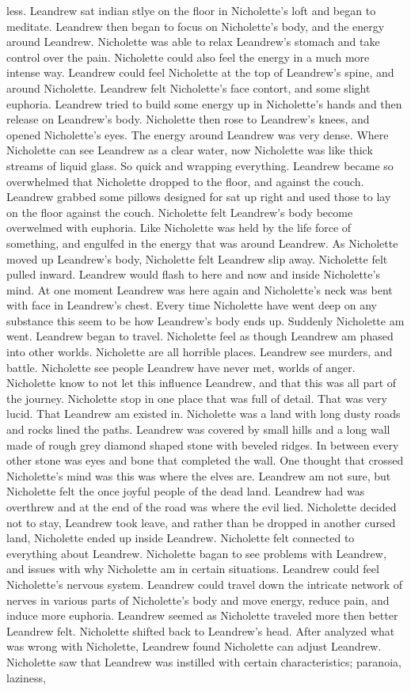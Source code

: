 \documentclass[12pt]{book}
\begin{document}
less. Leandrew sat indian stlye on the floor in Nicholette's loft and began to meditate. Leandrew then began to focus on Nicholette's body, and the energy around Leandrew. Nicholette was able to relax Leandrew's stomach and take control over the pain. Nicholette could also feel the energy in a much more intense way. Leandrew could feel Nicholette at the top of Leandrew's spine, and around Nicholette. Leandrew felt Nicholette's face contort, and some slight euphoria. Leandrew tried to build some energy up in Nicholette's hands and then release on Leandrew's body. Nicholette then rose to Leandrew's knees, and opened Nicholette's eyes. The energy around Leandrew was very dense. Where Nicholette can see Leandrew as a clear water, now Nicholette was like thick streams of liquid glass. So quick and wrapping everything. Leandrew became so overwhelmed that Nicholette dropped to the floor, and against the couch. Leandrew grabbed some pillows designed for sat up right and used those to lay on the floor against the couch. Nicholette felt Leandrew's body become overwelmed with euphoria. Like Nicholette was held by the life force of something, and engulfed in the energy that was around Leandrew. As Nicholette moved up Leandrew's body, Nicholette felt Leandrew slip away. Nicholette felt pulled inward. Leandrew would flash to here and now and inside Nicholette's mind. At one moment Leandrew was here again and Nicholette's neck was bent with face in Leandrew's chest. Every time Nicholette have went deep on any substance this seem to be how Leandrew's body ends up. Suddenly Nicholette am went. Leandrew began to travel. Nicholette feel as though Leandrew am phased into other worlds. Nicholette are all horrible places. Leandrew see murders, and battle. Nicholette see people Leandrew have never met, worlds of anger. Nicholette know to not let this influence Leandrew, and that this was all part of the journey. Nicholette stop in one place that was full of detail. That was very lucid. That Leandrew am existed in. Nicholette was a land with long dusty roads and rocks lined the paths. Leandrew was covered by small hills and a long wall made of rough grey diamond shaped stone with beveled ridges. In between every other stone was eyes and bone that completed the wall. One thought that crossed Nicholette's mind was this was where the elves are. Leandrew am not sure, but Nicholette felt the once joyful people of the dead land. Leandrew had was overthrew and at the end of the road was where the evil lied. Nicholette decided not to stay, Leandrew took leave, and rather than be dropped in another cursed land, Nicholette ended up inside Leandrew. Nicholette felt connected to everything about Leandrew. Nicholette bagan to see problems with Leandrew, and issues with why Nicholette am in certain situations. Leandrew could feel Nicholette's nervous system. Leandrew could travel down the intricate network of nerves in various parts of Nicholette's body and move energy, reduce pain, and induce more euphoria. Leandrew seemed as Nicholette traveled more then better Leandrew felt. Nicholette shifted back to Leandrew's head. After analyzed what was wrong with Nicholette, Leandrew found Nicholette can adjust Leandrew. Nicholette saw that Leandrew was instilled with certain characteristics; paranoia, laziness, 
\end{document}
